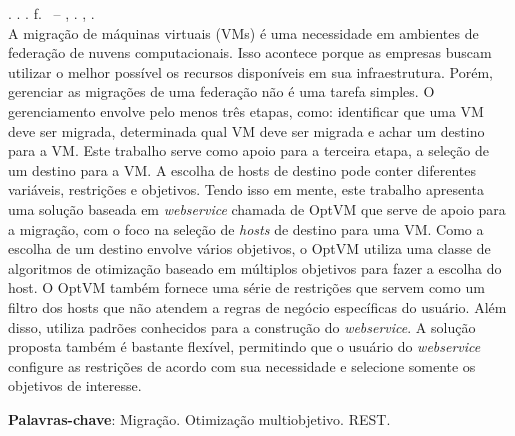 \begin{resumo}[RESUMO]
\begin{SingleSpacing}

\imprimirautorcitacao. \imprimirtitulo. \imprimirdata. \pageref {LastPage} f. \imprimirprojeto\ – \imprimirprograma, \imprimirinstituicao. \imprimirlocal, \imprimirdata.\\

A migração de máquinas virtuais (VMs) é uma necessidade em ambientes 
de federação de nuvens computacionais. Isso acontece porque as empresas
buscam utilizar o melhor possível os recursos disponíveis em sua infraestrutura.
Porém, gerenciar as migrações de uma federação não é uma tarefa simples. O gerenciamento
envolve pelo menos três etapas, como: identificar que uma VM deve ser migrada, determinada
qual VM deve ser migrada e achar um destino para a VM. Este trabalho serve como apoio 
para a terceira etapa, a seleção de um destino para a VM. A escolha de hosts de destino pode conter
diferentes variáveis, restrições e objetivos. Tendo isso em mente, este trabalho apresenta uma solução
baseada em \textit{webservice} chamada de OptVM que serve de apoio para a migração, com o foco na seleção 
de \textit{hosts} de destino para uma VM. Como a escolha de um destino envolve 
vários objetivos, o OptVM utiliza uma classe de algoritmos de otimização baseado em 
múltiplos objetivos para fazer a escolha do host. O OptVM também fornece uma série de restrições
que servem como um filtro dos hosts que não atendem a regras de negócio específicas do usuário.
Além disso, utiliza padrões conhecidos para a construção do \textit{webservice}.  
A solução proposta também é bastante flexível, permitindo que o 
usuário do \textit{webservice} configure as restrições de acordo com sua necessidade e 
selecione somente os objetivos de interesse.

\textbf{Palavras-chave}: Migração. Otimização multiobjetivo. REST.

\end{SingleSpacing}
\end{resumo}
